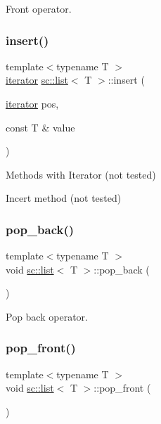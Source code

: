 Front operator. 

\mbox{\label{classsc_1_1list_a06b47c35531035c93c34d20b39277c99}} 
\subsubsection{\texorpdfstring{insert()}{insert()}}
{\footnotesize\ttfamily template$<$typename T $>$ \\
\hyperlink{classsc_1_1list_1_1iterator}{iterator} \hyperlink{classsc_1_1list}{sc\+::list}$<$ T $>$\+::insert (\begin{DoxyParamCaption}\item[{\hyperlink{classsc_1_1list_1_1iterator}{iterator}}]{pos,  }\item[{const T \&}]{value }\end{DoxyParamCaption})\hspace{0.3cm}{\ttfamily [inline]}}



Methods with Iterator (not tested) 

Incert method (not tested) \mbox{\label{classsc_1_1list_a3d6fc0a4f2c1db7c74af5a482c1a03ca}} 
\subsubsection{\texorpdfstring{pop\+\_\+back()}{pop\_back()}}
{\footnotesize\ttfamily template$<$typename T $>$ \\
void \hyperlink{classsc_1_1list}{sc\+::list}$<$ T $>$\+::pop\+\_\+back (\begin{DoxyParamCaption}{ }\end{DoxyParamCaption})\hspace{0.3cm}{\ttfamily [inline]}}



Pop back operator. 

\mbox{\label{classsc_1_1list_ab3fbf66643f4356cf0c1947bd4fdf48e}} 
\subsubsection{\texorpdfstring{pop\+\_\+front()}{pop\_front()}}
{\footnotesize\ttfamily template$<$typename T $>$ \\
void \hyperlink{classsc_1_1list}{sc\+::list}$<$ T $>$\+::pop\+\_\+front (\begin{DoxyParamCaption}{ }\end{DoxyParamCaption})\hspace{0.3cm}{\ttfamily [inline]}}



